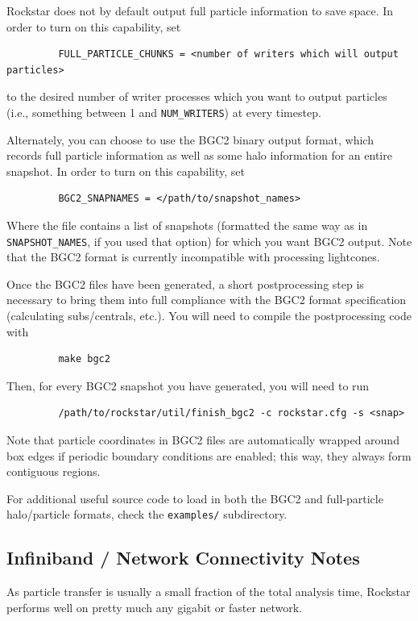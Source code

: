 \documentclass[12pt]{article}
\begin{document}
      Rockstar does not by default output full particle information to
      save space.  In order to turn on this capability, set
\begin{verbatim}
         FULL_PARTICLE_CHUNKS = <number of writers which will output particles>
\end{verbatim}
      to the desired number of writer processes which you want to output
      particles (i.e., something between 1 and \texttt{NUM\_WRITERS}) at every timestep.

      Alternately, you can choose to use the BGC2 binary output format, which
      records full particle information as well as some halo information for
      an entire snapshot.  In order to turn on this capability, set
\begin{verbatim}
         BGC2_SNAPNAMES = </path/to/snapshot_names>
\end{verbatim}
      Where the file contains a list of snapshots (formatted the same way as
      in \texttt{SNAPSHOT\_NAMES}, if you used that option) for which you want BGC2
      output.  Note that the BGC2 format is currently incompatible with processing
      lightcones.

      Once the BGC2 files have been generated, a short postprocessing step
      is necessary to bring them into full compliance with the BGC2 format specification (calculating
      subs/centrals, etc.).  You will need to compile the postprocessing
      code with
\begin{verbatim}
         make bgc2
\end{verbatim}
      Then, for every BGC2 snapshot you have generated, you will need to run
\begin{verbatim}
         /path/to/rockstar/util/finish_bgc2 -c rockstar.cfg -s <snap>
\end{verbatim}
      Note that particle coordinates in BGC2 files are automatically wrapped around
      box edges if periodic boundary conditions are enabled; this way, they
      always form contiguous regions.

      For additional useful source code to load in both the BGC2 and
      full-particle halo/particle formats, check the \texttt{examples/} subdirectory.


\subsection{Infiniband / Network Connectivity Notes}
      As particle transfer is usually a small fraction of the total analysis
      time, Rockstar performs well on pretty much any gigabit or faster network.
\end{document}
